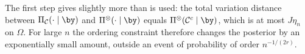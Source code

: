 The first step gives slightly more than is used: the total variation distance between $\Pi_{\mathcal C}(\cdot\mid\by)$ and $\Pi^{\otimes}(\cdot\mid\by)$ equals $\Pi^{\otimes}(\mathcal C^c\mid\by)$, which is at most $J\eta_n$ on $\Omega$. For large $n$ the ordering constraint therefore changes the posterior by an exponentially small amount, outside an event of probability of order $n^{-1/(2r)}$.
